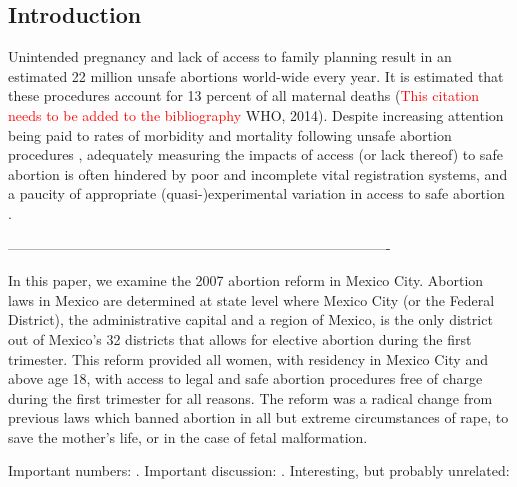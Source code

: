 \documentclass[a4paper, 11pt]{article}
\begin{document}
\begin{spacing}{1.5}
 
 
\newpage
\begin{multicols}{2}
\section{Introduction}
Unintended pregnancy and lack of access to family planning result in an 
estimated 22 million unsafe abortions world-wide every year.  It is estimated 
that these procedures account for 13 percent of all maternal deaths 
(\textcolor{red}{This citation needs to be added to the bibliography} WHO, 2014).  
Despite increasing attention being paid to rates of morbidity and mortality 
following unsafe abortion procedures \citep{Grimes2006,Brown2007,Kulczycki2011}, 
adequately measuring the impacts of access (or lack thereof) to safe abortion is 
often hindered by poor and incomplete vital registration systems, and a paucity of 
appropriate (quasi-)experimental variation in access to safe abortion 
\citep{Grimes2006}.


----------------------------------------------------------------------------------
 
 In this paper, we examine the 2007 abortion reform in Mexico City. Abortion laws in Mexico are determined at state level where Mexico City (or the Federal District), the administrative capital and a region of Mexico, is the only district out of Mexico's 32 districts that allows for elective abortion during the first trimester. This reform provided all women, with residency in Mexico City and above age 18, with access to legal and safe abortion procedures free of charge during the first trimester for all reasons. The reform was a radical change from previous laws which banned abortion in all but extreme circumstances of rape, to save the mother’s life, or in the case of fetal malformation. 

Important numbers: \citet{Sedghetal2007,Sedghetal2012,Khanetal2006}.
Important discussion: \citet{WinikoffSheldon2012,TheLancet2009,TheLancet2007,Chowdhury2007}. 
Interesting, but probably unrelated: \citet{TempletonGrimes2011}


\end{multicols}
\end{spacing}
\end{document}
